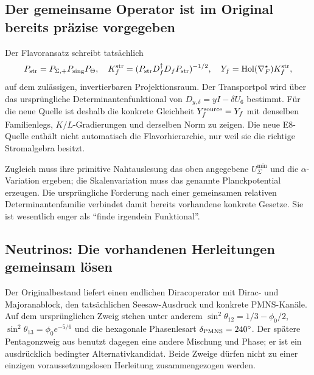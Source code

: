 \subsection{Der gemeinsame Operator ist im Original bereits präzise vorgegeben}
Der Flavoransatz schreibt tatsächlich
\begin{equation}
P_{\rm str}=P_{\Sigma,+}P_{\rm sing}P_\Theta,\quad
K_f^{\rm str}=(P_{\rm str}D_f^\dagger D_fP_{\rm str})^{-1/2},\quad
Y_f=\operatorname{Hol}(\nabla_F^\star)K_f^{\rm str},
\end{equation}
auf dem zulässigen, invertierbaren Projektionsraum. Der Transportpol wird über das ursprüngliche Determinantenfunktional von $D_{y,\delta}=yI-\delta U_6$ bestimmt. Für die neue Quelle ist deshalb die konkrete Gleichheit $Y_f^{\rm source}=Y_f$ mit denselben Familienlegs, $K/L$-Gradierungen und derselben Norm zu zeigen. Die neue E8-Quelle enthält nicht automatisch die Flavorhierarchie, nur weil sie die richtige Stromalgebra besitzt.

Zugleich muss ihre primitive Nahtauslesung das oben angegebene $U_\Sigma^{\min}$ und die $\alpha$-Variation ergeben; die Skalenvariation muss das genannte Planckpotential erzeugen. Die ursprüngliche Forderung nach einer gemeinsamen relativen Determinantenfamilie verbindet damit bereits vorhandene konkrete Gesetze. Sie ist wesentlich enger als ``finde irgendein Funktional''.


\subsection{Neutrinos: Die vorhandenen Herleitungen gemeinsam lösen}\label{sec:neutrinojoint}

Der Originalbestand liefert einen endlichen Diracoperator mit Dirac- und Majoranablock, den tatsächlichen Seesaw-Ausdruck und konkrete PMNS-Kanäle. Auf dem ursprünglichen Zweig stehen unter anderem $\sin^2\theta_{12}=1/3-\phi_0/2$, $\sin^2\theta_{13}=\phi_0e^{-5/6}$ und die hexagonale Phasenlesart $\delta_{\rm PMNS}=240^\circ$. Der spätere Pentagonzweig aus  benutzt dagegen eine andere Mischung und Phase; er ist ein ausdrücklich bedingter Alternativkandidat. Beide Zweige dürfen nicht zu einer einzigen voraussetzungslosen Herleitung zusammengezogen werden.


